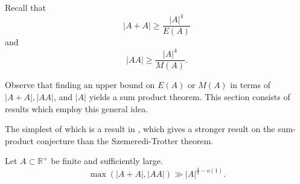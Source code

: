 \documentclass[12pt]{amsart}
\begin{document}
Recall that
\[
    \left\lvert A + A \right\rvert \geq  \frac{\left\lvert A \right\rvert ^{4}}{ E(A) }
\]
and
\[
    \left\lvert AA \right\rvert \geq \frac{\left\lvert A \right\rvert ^{4}}{M(A) }
.\]

Observe that finding an upper bound on \(E(A)\) or \(M(A)\) in terms of \(\left\lvert A + A \right\rvert, \left\lvert AA \right\rvert    \), and \(\left\lvert A \right\rvert \)
yields a sum product theorem. This section consists of results which employ this general idea.

The simplest of which is a result in \cite{Solymosi}, which gives a stronger result
on the sum-product conjecture than the Szemeredi-Trotter theorem. 

\begin{theorem}
Let \(A \subset \mathbb{R}^{+} \) be finite and sufficiently large.
\[
    \max \left( \left\lvert A+A \right\rvert , \left\lvert AA \right\rvert  \right) \gg \left\lvert A \right\rvert ^{\frac{4}{3} - o(1)}
.\]
\end{theorem}
\end{document}
